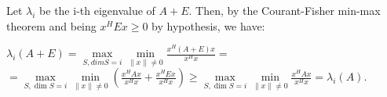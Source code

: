 \documentclass[12pt]{article}
\begin{document}
Let $\lambda_i$ be the i-th eigenvalue of $A+E$. Then, by the Courant-Fisher min-max theorem and being $x^HEx \geq 0$ by hypothesis, we have:

$\lambda_i(A+E)=\max\limits_{S, dim S=i}\min\limits_{\|x\|\ne 0}\frac{x^H(A+E)x}{x^H x}=$\\
$=\max\limits_{S,\dim S=i}\min\limits_{\|x\|\ne 0}\left(\frac{x^HAx}{x^Hx}+\frac{x^HEx}{x^Hx}\right)\geq\max\limits_{S,\dim S=i}\min\limits_{\|x\|\ne 0}\frac{x^HAx}{x^Hx}=\lambda_i(A)$.
\end{document}
